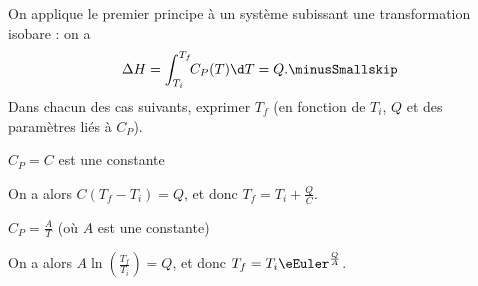 \hauteurLargeurCadreReponse		{7mm}{5cm}
\typeEntrainement				{} %
\initialisationEntrainement

\debutEntrainement

On applique le premier principe à un système subissant une transformation isobare : on a \minusSmallskip
\[
\Delta H = \int_{T_i}^{T_f} \! \! C_P(T) \d T = Q. \minusSmallskip
\]
Dans chacun des cas suivants, exprimer $T_f$ (en fonction de $T_i$, $Q$ et des paramètres liés à $C_P$).



\begin{enonce}
$C_P=C$ est une constante
\end{enonce}


\begin{corrigeNewpage}
On a alors $C(T_f-T_i)=Q$, et donc $T_f=T_i+\frac{Q}{C}$.
\end{corrigeNewpage}



\begin{enonce}
$C_P=\frac{A}{T}$ (où $A$ est une constante)
\end{enonce}


\begin{corrige}
On a alors $A \ln\left (\frac{T_f}{T_i}\right) = Q$, et donc $T_f=T_i \eEuler^{\frac{Q}{A}}$.
\end{corrige}



